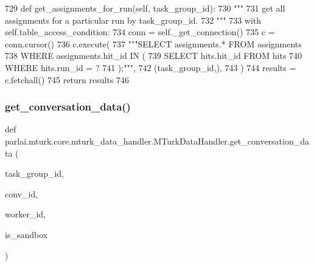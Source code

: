 \begin{DoxyCode}
729     \textcolor{keyword}{def }get\_assignments\_for\_run(self, task\_group\_id):
730         \textcolor{stringliteral}{"""}
731 \textcolor{stringliteral}{        get all assignments for a particular run by task\_group\_id.}
732 \textcolor{stringliteral}{        """}
733         with self.table\_access\_condition:
734             conn = self.\_get\_connection()
735             c = conn.cursor()
736             c.execute(
737                 \textcolor{stringliteral}{"""SELECT assignments.* FROM assignments}
738 \textcolor{stringliteral}{                         WHERE assignments.hit\_id IN (}
739 \textcolor{stringliteral}{                           SELECT hits.hit\_id FROM hits}
740 \textcolor{stringliteral}{                           WHERE hits.run\_id = ?}
741 \textcolor{stringliteral}{                         );"""},
742                 (task\_group\_id,),
743             )
744             results = c.fetchall()
745             \textcolor{keywordflow}{return} results
746 
\end{DoxyCode}
\mbox{\label{classparlai_1_1mturk_1_1core_1_1mturk__data__handler_1_1MTurkDataHandler_a0a245b58629056030d5eedfce5c5a985}} 
\subsubsection{\texorpdfstring{get\+\_\+conversation\+\_\+data()}{get\_conversation\_data()}}
{\footnotesize\ttfamily def parlai.\+mturk.\+core.\+mturk\+\_\+data\+\_\+handler.\+M\+Turk\+Data\+Handler.\+get\+\_\+conversation\+\_\+data (\begin{DoxyParamCaption}\item[{}]{task\+\_\+group\+\_\+id,  }\item[{}]{conv\+\_\+id,  }\item[{}]{worker\+\_\+id,  }\item[{}]{is\+\_\+sandbox }\end{DoxyParamCaption})\hspace{0.3cm}{\ttfamily [static]}}

